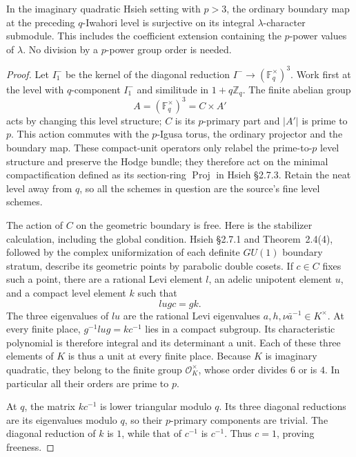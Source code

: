 \begin{lemma}
\label{AC-G67-boundary}
In the imaginary quadratic Hsieh setting with $p>3$, the
ordinary boundary map at the preceding $q$-Iwahori level is
surjective on its integral $\lambda$-character submodule.
This includes the coefficient extension containing the
$p$-power values of $\lambda$.  No division by a $p$-power
group order is needed.
\end{lemma}
\begin{proof}
Let $I_1^-$ be the kernel of the diagonal reduction
$I^-\to(\mathbb F_q^\times)^3$.  Work first at the level
with $q$-component $I_1^-$ and similitude in
$1+q\mathbb Z_q$.  The finite abelian group
\[
          A=(\mathbb F_q^\times)^3=C\times A'
                                                        \tag{G67.7}
\]
acts by changing this level structure; $C$ is its $p$-primary
part and $|A'|$ is prime to $p$.  This action commutes with
the $p$-Igusa torus, the ordinary projector and the boundary
map.  These compact-unit operators only relabel the
prime-to-$p$ level structure and preserve the Hodge bundle;
they therefore act on the minimal compactification defined
as its section-ring $\operatorname{Proj}$ in Hsieh \S2.7.3.
Retain the neat level away from $q$,
so all the schemes in question are the source's fine level
schemes.

The action of $C$ on the geometric boundary is free.  Here is
the stabilizer calculation, including the global condition.
Hsieh \S2.7.1 and Theorem~2.4(4), followed by the complex
uniformization of each definite $GU(1)$ boundary stratum,
describe its geometric points by parabolic double cosets.
If $c\in C$ fixes such a point, there are a rational Levi
element $l$, an adelic unipotent element $u$, and a compact
level element $k$ such that
\[
                   l u g c=gk.                           \tag{G67.8}
\]
The three eigenvalues of $lu$ are the rational Levi
eigenvalues $a,h,\nu\bar a^{-1}\in K^\times$.  At every
finite place, $g^{-1}lug=kc^{-1}$ lies in a compact subgroup.
Its characteristic polynomial is therefore integral and its
determinant a unit.  Each of these three elements of $K$ is
thus a unit at every finite place.  Because $K$ is imaginary
quadratic, they belong to the finite group
$\mathcal O_K^\times$, whose order divides $6$ or is $4$.
In particular all their orders are prime to $p$.

At $q$, the matrix $kc^{-1}$ is lower triangular modulo $q$.
Its three diagonal reductions are its eigenvalues modulo
$q$, so their $p$-primary components are trivial.  The
diagonal reduction of $k$ is $1$, while that of $c^{-1}$
is $c^{-1}$.  Thus $c=1$, proving freeness.


\end{proof}
